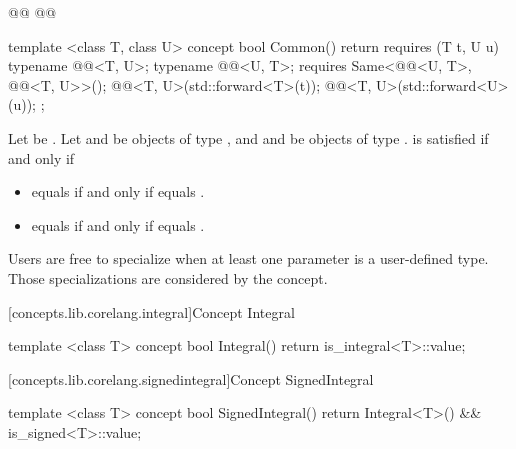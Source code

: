 \begin{addedblock}
%
\begin{itemdecl}
@@
@@

template <class T, class U>
concept bool Common() {
  return requires (T t, U u) {
    typename @@<T, U>;
    typename @@<U, T>;
    requires Same<@@<U, T>, @@<T, U>>();
    @@<T, U>(std::forward<T>(t));
    @@<T, U>(std::forward<U>(u));
  };
}
\end{itemdecl}

\begin{itemdescr}
\pnum
Let  be . Let  and  be objects
of type , and  and  be objects of type .
 is satisfied if and only if
\begin{itemize}
\item {} equals  if and only if  equals .
\item {} equals  if and only if  equals .
\end{itemize}

\pnum
\enternote Users are free to specialize  when at least one parameter is a
user-defined type. Those specializations are considered by the  concept.\exitnote

\end{itemdescr}

[concepts.lib.corelang.integral]{Concept Integral}

%
\begin{itemdecl}
template <class T>
concept bool Integral() {
  return is_integral<T>::value;
}
\end{itemdecl}

[concepts.lib.corelang.signedintegral]{Concept SignedIntegral}

%
\begin{itemdecl}
template <class T>
concept bool SignedIntegral() {
  return Integral<T>() && is_signed<T>::value;
}
\end{itemdecl}


\end{addedblock}
